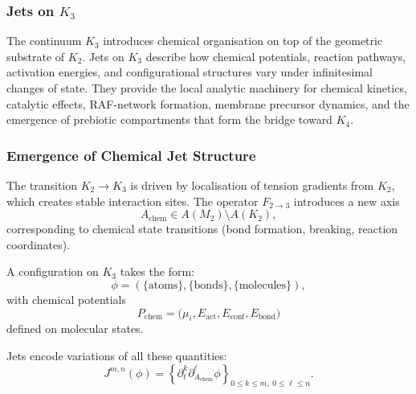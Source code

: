 
\subsubsection{Jets on \texorpdfstring{$K_3$}{K_3}}
\label{sec:jets-k3}

The continuum $K_3$ introduces chemical organisation on top of the
geometric substrate of $K_2$. Jets on $K_3$ describe how chemical
potentials, reaction pathways, activation energies, and configurational
structures vary under infinitesimal changes of state. They provide the
local analytic machinery for chemical kinetics, catalytic effects,
RAF-network formation, membrane precursor dynamics, and the emergence of
prebiotic compartments that form the bridge toward $K_4$.



\subsubsection{Emergence of Chemical Jet Structure}

The transition $K_2 \to K_3$ is driven by localisation of tension
gradients from $K_2$, which creates stable interaction sites. The
operator $F_{2\to3}$ introduces a new axis
\[
A_{\mathrm{chem}} \in A(M_2)\setminus A(K_2),
\]
corresponding to chemical state transitions (bond formation, breaking,
reaction coordinates).

A configuration on $K_3$ takes the form:
\[
\phi = (\{\text{atoms}\},\{\text{bonds}\},\{\text{molecules}\}),
\]
with chemical potentials
\[
P_{\mathrm{chem}} = \bigl(\mu_i, E_{\mathrm{act}}, E_{\mathrm{conf}}, E_{\mathrm{bond}}\bigr)
\]
defined on molecular states.

Jets encode variations of all these quantities:
\[
J^{m,n}(\phi) =
\left\{
\partial_t^k \partial_{A_{\mathrm{chem}}}^{\ell} \phi
\right\}_{0\le k\le m,\; 0\le\ell\le n}.
\]



